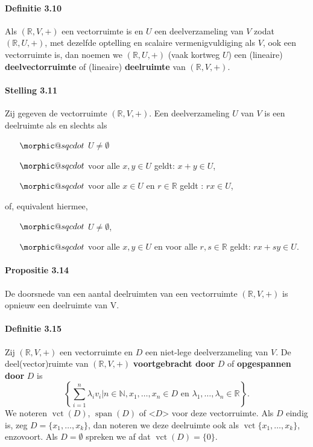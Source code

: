 \documentclass[11pt,oneside,a4paper]{article}
\makeatletter
\DeclareRobustCommand{\sqcdot}{\mathbin{\mathpalette\morphic@sqcdot\relax}}
\newcommand{\morphic@sqcdot}[2]{%
	\sbox\z@{$\m@th#1\centerdot$}%
	\ht\z@=.33333\ht\z@
	\vcenter{\box\z@}%
}
\DeclareMathOperator{\vct}{vct}
\DeclareMathOperator{\Span}{span}
\makeatother
\begin{document}
	\paragraph{Definitie 3.10} 
		Als $(\mathbb{R}, V, +)$ een vectorruimte is en $U$ een deelverzameling van $V$ zodat $(\mathbb{R}, U, +)$, met dezelfde optelling en scalaire vermenigvuldiging als $V$, ook een vectorruimte is, dan noemen we $(\mathbb{R}, U, +)$ (vaak kortweg $U$) een (lineaire) \textbf{deelvectorruimte} of (lineaire) \textbf{deelruimte} van $(\mathbb{R}, V, +)$.
	\paragraph{Stelling 3.11}
		Zij gegeven de vectorruimte $(\mathbb{R}, V, +)$. Een deelverzameling $U$ van $V$ is een deelruimte als en slechts als
		\begin{itemize}
			\item[$\sqcdot$] $U \ne \emptyset$
			\item[$\sqcdot$] voor alle $x, y \in U$ geldt: $x+y\in U$,
			\item[$\sqcdot$] voor alle $x \in U$ en $r \in \mathbb{R}$ geldt : $rx \in U$,
		\end{itemize}
		of, equivalent hiermee,
		\begin{itemize}
		\item[$\sqcdot$] $U \ne \emptyset$,
		\item[$\sqcdot$] voor alle $x,y \in U$ en voor alle $r,s \in \mathbb{R}$ geldt: $rx +sy \in U$.
		\end{itemize}
	\paragraph{Propositie 3.14}
		De doorsnede van een aantal deelruimten van een vectorruimte $(\mathbb{R}, V, +)$ is opnieuw een deelruimte van V.
	\paragraph{Definitie 3.15}
		Zij $(\mathbb{R}, V, +)$ een vectorruimte en $D$ een niet-lege deelverzameling van $V$. De deel(vector)ruimte van $(\mathbb{R}, V, +)$ \textbf{voortgebracht door} $D$ of \textbf{opgespannen door} $D$ is $$\left\{\sum\limits_{i=1}^{n} \lambda_i v_i | n\in \mathbb{N}, x_1, \ldots , x_n \in D \text{ en } \lambda_1, \ldots, \lambda_n \in \mathbb{R}\right\}.$$ We noteren $\vct(D)$, $\Span(D)$ of $\mathord{<} D \mathord{>}$ voor deze vectorruimte. Als $D$ eindig is, zeg $D = \{x_1 , \ldots , x_k\}$, dan noteren we deze deelruimte ook als $\vct \{x_1 , \ldots , x_k\}$, enzovoort. Als $D = \emptyset$ spreken we af dat $\vct(D) = \{0\}$.
\end{document}
